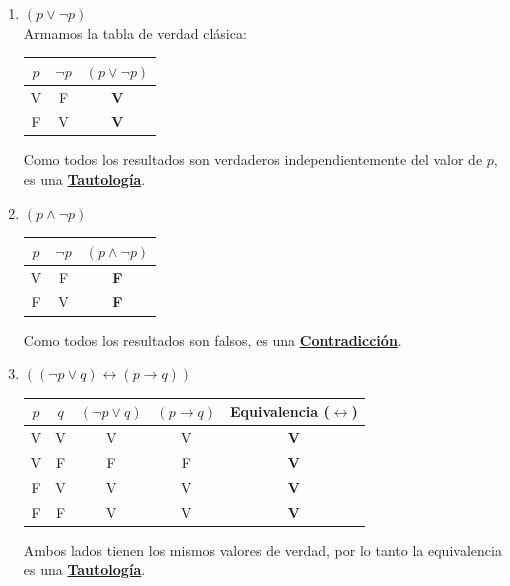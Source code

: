 \begin{enumerate}[label=\textbf{\alph*)}]

    \item \textbf{$(p \vee \neg p)$} \\
    Armamos la tabla de verdad clásica:
    \begin{center}
    \begin{tabular}{|c|c|c|}
    \hline
    $p$ & $\neg p$ & $(p \vee \neg p)$ \\
    \hline
    V & F & \textbf{V} \\
    F & V & \textbf{V} \\
    \hline
    \end{tabular}
    \end{center}
    Como todos los resultados son verdaderos independientemente del valor de $p$, es una \underline{\textbf{Tautología}}.

    \vspace{0.4cm}
    \item \textbf{$(p \wedge \neg p)$}
    \begin{center}
    \begin{tabular}{|c|c|c|}
    \hline
    $p$ & $\neg p$ & $(p \wedge \neg p)$ \\
    \hline
    V & F & \textbf{F} \\
    F & V & \textbf{F} \\
    \hline
    \end{tabular}
    \end{center}
    Como todos los resultados son falsos, es una \underline{\textbf{Contradicción}}.

    \vspace{0.4cm}
    \item \textbf{$((\neg p \vee q) \leftrightarrow (p \rightarrow q))$}
    \begin{center}
    \begin{tabular}{|c|c|c|c|c|}
    \hline
    $p$ & $q$ & $(\neg p \vee q)$ & $(p \rightarrow q)$ & Equivalencia ($\leftrightarrow$) \\
    \hline
    V & V & V & V & \textbf{V} \\
    V & F & F & F & \textbf{V} \\
    F & V & V & V & \textbf{V} \\
    F & F & V & V & \textbf{V} \\
    \hline
    \end{tabular}
    \end{center}
    Ambos lados tienen los mismos valores de verdad, por lo tanto la equivalencia es una \underline{\textbf{Tautología}}.


\end{enumerate}
